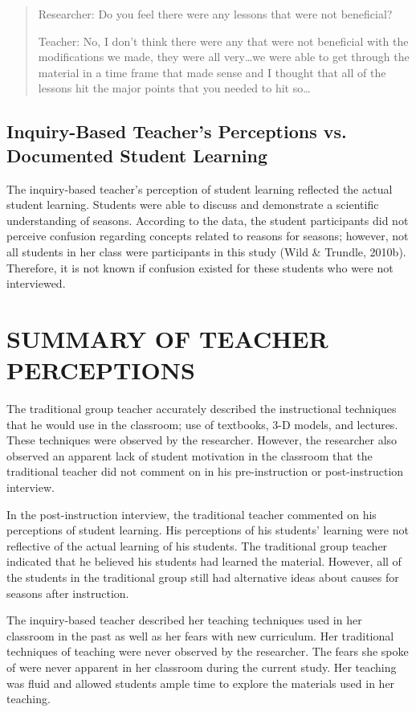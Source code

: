 \documentclass[11.5pt]{sig-alternate} %
\begin{document}
\begin{large}
\begin{quote}
Researcher:  Do you feel there were any lessons that were not beneficial?

Teacher:  No, I don’t think there were any that were not beneficial with the modifications we made, they were all very…we were able to get through the material in a time frame that made sense and I thought that all of the lessons hit the major points that you needed to hit so…
\end{quote}

\subsection*{Inquiry-Based Teacher’s Perceptions vs. Documented Student Learning}
	 
The inquiry-based teacher’s perception of student learning reflected the actual student learning. Students were able to discuss and demonstrate a scientific understanding of seasons.  According to the data, the student participants did not perceive confusion regarding concepts related to reasons for seasons; however, not all students in her class were participants in this study (Wild \& Trundle, 2010b).  Therefore, it is not known if confusion existed for these students who were not interviewed.

\section*{SUMMARY OF TEACHER PERCEPTIONS}

The traditional group teacher accurately described the instructional techniques that he would use in the classroom; use of textbooks, 3-D models, and lectures. These techniques were observed by the researcher.  However, the researcher also observed an apparent lack of student motivation in the classroom that the traditional teacher did not comment on in his pre-instruction or post-instruction interview. 

In the post-instruction interview, the traditional teacher commented on his perceptions of student learning.  His perceptions of his students’ learning were not reflective of the actual learning of his students. The traditional group teacher indicated that he believed his students had learned the material. However, all of the students in the traditional group still had alternative ideas about causes for seasons after instruction.

The inquiry-based teacher described her teaching techniques used in her classroom in the past as well as her fears with new curriculum. Her traditional techniques of teaching were never observed by the researcher. The fears she spoke of were never apparent in her classroom during the current study. Her teaching was fluid and allowed students ample time to explore the materials used in her teaching. 


\end{large}
\end{document}

